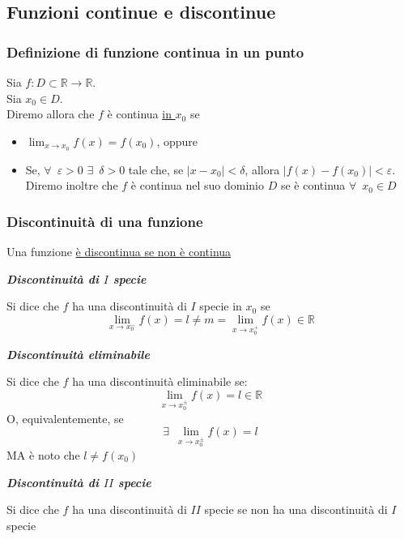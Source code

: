 \documentclass{article}
\theoremstyle{definition}
\begin{document}
\newpage
\subsection{Funzioni continue e discontinue}
\subsubsection{Definizione di funzione continua in un punto}
Sia $f: D \subset \mathbb{R} \to \mathbb{R}$.
\\
Sia $x_0 \in D$. 
\\
Diremo allora che $f$ è continua \underline{in $x_0$} se \begin{itemize}
    \item $\lim_{x \to x_0}f(x)=f(x_0)$, oppure
    \item Se, $\forall \,\,\, \varepsilon>0$ $\exists\,\,\, \delta >0$ tale che, se $|x-x_0|<\delta$, allora $|f(x)-f(x_0)|<\varepsilon$.
    \\
    Diremo inoltre che $f$ è continua nel suo dominio $D$ se è continua $\forall \,\,\, x_0 \in D$
\end{itemize}
\subsubsection{Discontinuità di una funzione}
Una funzione \underline{è discontinua se non è continua}
\\
\begin{center}
    \textbf{\textit{Discontinuità di $I$ specie}}
\end{center}
Si dice che $f$ ha una discontinuità di $I$ specie in $x_0$ se
\begin{equation}
    \lim_{x \to x_0^-}f(x)=l \neq m = \lim_{x\to x_0^+}f(x) \in \mathbb{R}
\end{equation}

\begin{center}
    \textbf{\textit{Discontinuità eliminabile}}
\end{center}
Si dice che $f$ ha una discontinuità eliminabile se:
\begin{equation}
    \lim_{x \to x_0^{\pm}}f(x)=l \in \mathbb{R}
\end{equation}
O, equivalentemente, se 
\begin{equation}
    \exists \,\,\, \lim_{x \to x_0^{\pm}}f(x)=l
\end{equation}
MA è noto che $l \neq f(x_0)$
\begin{center}
    \textbf{\textit{Discontinuità di $II$ specie}}
\end{center}
Si dice che $f$ ha una discontinuità di $II$ specie se non ha una discontinuità di $I$ specie
\end{document}
